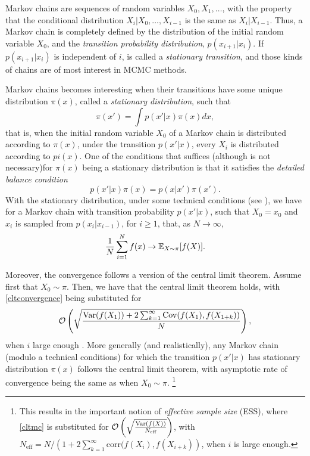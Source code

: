 Markov chains are sequences of random variables $X_0,X_1,\ldots$, with the property that the conditional distribution $X_i|X_0,\ldots,X_{i-1}$ is the same as $X_i|X_{i-1}$. Thus, a Markov chain is completely defined by the distribution of the initial random variable $X_0$, and the \textit{transition probability distribution},  $p(x_{i+1}|x_i)$. If $p(x_{i+1}|x_i)$ is independent of $i$, is called a \textit{stationary transition}, and those kinds of chains are of most interest in MCMC methods.

Markov chains becomes interesting when their transitions have some unique distribution $\pi(x)$, called a \textit{stationary distribution}, such that 
\begin{equation}
 \pi(x') = \int p(x'|x) \pi(x) dx,
\end{equation}
that is, when the initial random variable $X_0$ of a Markov chain is distributed according to $\pi(x)$, under the transition $p(x'|x)$, every $X_i$ is distributed according to $pi(x)$. One of the conditions that suffices (although is not necessary)for $\pi(x)$ being a stationary distribution is that it satisfies the \textit{detailed balance condition}
\begin{equation}
 p(x'|x)\pi(x) = p(x|x')\pi(x').
\end{equation}
With the stationary distribution, under some technical conditions (see \cite{Robert_2005}), we have for a Markov chain with transition probability $p(x'|x)$, such that $X_0 = x_0$ and $x_i$ is sampled from $p(x_i|x_{i-1})$, for $i \geq 1$, that, as $N \to \infty$,
\begin{equation}
 \frac{1}{N} \sum_{i=1}^N f(x) \to {\mathbb E}_{X \sim \pi}[f(X)].
\end{equation}

Moreover, the convergence follows a version of the central limit theorem. Assume first that $X_0 \sim \pi$. Then, we have that the central limit theorem holds, with \eqref{cltconvergence} being substituted for
\begin{equation}\label{cltmc}
 \mathcal{O}\left(\sqrt{\frac{\mathrm{Var}(f(X_1)) + 2 \sum_{k=1}^\infty \mathrm{Cov}(f(X_1),f(X_{1+k}))}{N}}\right),
\end{equation}
when $i$ large enough \cite{Geyer_2011}. More generally (and realistically), any Markov chain (modulo a technical conditions) for which the transition $p(x'|x)$ has stationary distribution $\pi(x)$ follows the central limit theorem, with asymptotic rate of convergence being the same as when $X_0 \sim \pi$. \footnote{This results in the important notion of \textit{effective sample size} (ESS), where \eqref{cltmc} is substituted for $\mathcal{O}\left(\sqrt{\frac{\mathrm{Var}(f(X))}{N_{\text{eff}}}}\right)$, with $N_\text{eff} = N/\left(1+2\sum_{k=1}^\infty \text{corr}(f(X_i),f(X_{i+k})\right)$, when $i$ is large enough.}
		
